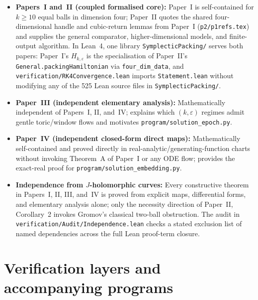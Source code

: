 \documentclass[11pt]{amsart}
\newcommand{\eps}{\varepsilon}
\begin{document}
\begin{itemize}[leftmargin=1.8em]
\item \textbf{Papers~I and~II (coupled formalised core):} Paper~I is self-contained for $k\ge10$ equal balls in
dimension four; Paper~II quotes the shared four-dimensional handle and cubic-return lemmas from Paper~I
(\texttt{p2/p1refs.tex}) and supplies the general comparator, higher-dimensional models, and finite-output algorithm. In
Lean~4, one library \texttt{SymplecticPacking/} serves both papers: Paper~I's $H_{k,\eps}$ is the specialisation of
Paper~II's \texttt{General.packingHamiltonian} via \texttt{four\_dim\_data}, and \texttt{verification/RK4Convergence.lean}
imports \texttt{Statement.lean} without modifying any of the 525 Lean source files in \texttt{SymplecticPacking/}.
\item \textbf{Paper~III (independent elementary analysis):} Mathematically independent of Papers~I, II, and~IV; explains
which $(k,\eps)$ regimes admit gentle toric/window flows and motivates \texttt{program/solution\_epoch.py}.
\item \textbf{Paper~IV (independent closed-form direct maps):} Mathematically self-contained and proved directly in
real-analytic/generating-function charts without invoking Theorem~A of Paper~I or any ODE flow; provides the exact-real
proof for \texttt{program/solution\_embedding.py}.
\item \textbf{Independence from $J$-holomorphic curves:} Every constructive theorem in Papers~I, II, III, and~IV is
proved from explicit maps, differential forms, and elementary analysis alone; only the necessity direction of Paper~II,
Corollary~2 invokes Gromov's classical two-ball obstruction. The audit in
\texttt{verification/Audit/Independence.lean} checks a stated exclusion list of named dependencies across the full Lean proof-term closure.
\end{itemize}

\section{Verification layers and accompanying programs}\label{sec:verification}
\end{document}
